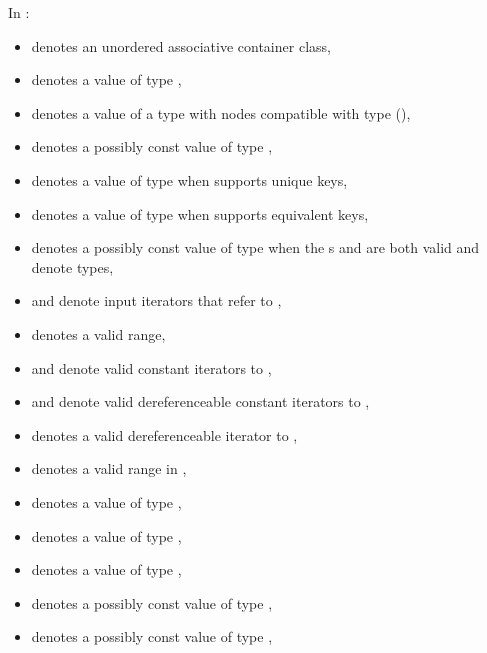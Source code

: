 \pnum
{}%
%
%
%
%
%
In :
\begin{itemize}
\item {} denotes an unordered associative container class,
\item {} denotes a value of type ,
\item {} denotes a value of a type with nodes compatible
  with type  (),
\item {} denotes a possibly const value of type ,
\item {} denotes a value of type 
  when  supports unique keys,
\item {} denotes a value of type 
  when  supports equivalent keys,
\item {} denotes a possibly const value of type 
  when the s
   and
  are both valid and denote types,
\item {} and  denote input iterators
  that refer to ,
\item {} denotes a valid range,
\item {} and  denote valid constant iterators to ,
\item {} and  denote
  valid dereferenceable constant iterators to ,
\item {} denotes a valid dereferenceable iterator to ,
\item {} denotes a valid range in ,
\item {} denotes a value of type ,
\item {} denotes a value of type ,
\item {} denotes a value of type ,
\item {} denotes a possibly const value of type ,
\item {} denotes a possibly const value of type ,

\end{itemize}
